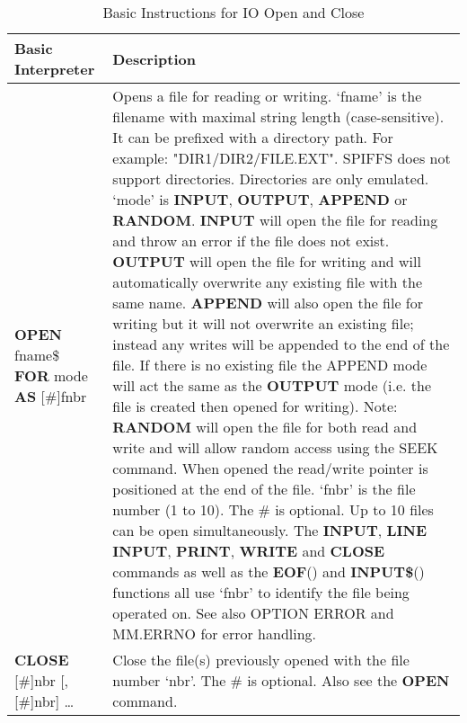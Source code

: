 \begin{table}[]
\centering
\caption{Basic Instructions for IO Open and Close}
\label{Basic_Instructions_for_IO_Open_Close}
\begin{tabular}{|p{4cm}|p{10cm}|}
\hline
\textbf{Basic Interpreter} & \textbf{Description}                                                   \\ \hline
\textbf{OPEN} fname\$ \textbf{FOR} mode
\textbf{AS} [\#]fnbr
& Opens a file for reading or writing.
‘fname’ is the filename with maximal string length (case-sensitive). It can be prefixed with a directory path. For example: "DIR1/DIR2/FILE.EXT". SPIFFS does not support directories. Directories are only emulated. \newline
‘mode’ is \textbf{INPUT}, \textbf{OUTPUT}, \textbf{APPEND} or \textbf{RANDOM}.\newline\newline
\textbf{INPUT} will open the file for reading and throw an error if the file does
not exist. \newline
\textbf{OUTPUT} will open the file for writing and will automatically
overwrite any existing file with the same name.\newline
\textbf{APPEND} will also open the file for writing but it will not overwrite an
existing file; instead any writes will be appended to the end of the file. If
there is no existing file the APPEND mode will act the same as the
\textbf{OUTPUT} mode (i.e. the file is created then opened for writing). \newline
Note:\newline
\textbf{RANDOM} will open the file for both read and write and will allow
random access using the SEEK command. When opened the read/write
pointer is positioned at the end of the file.\newline
‘fnbr’ is the file number (1 to 10). The \# is optional. Up to 10 files can
be open simultaneously. The \textbf{INPUT}, \textbf{LINE INPUT}, \textbf{PRINT}, \textbf{WRITE}
and \textbf{CLOSE} commands as well as the \textbf{EOF}() and \textbf{INPUT\$}() functions all
use ‘fnbr’ to identify the file being operated on.\newline
See also OPTION ERROR and MM.ERRNO for error handling.
\\ \hline
\textbf{CLOSE} [\#]nbr [,[\#]nbr] … &
Close the file(s) previously opened with the file number ‘nbr’.
The \# is optional. Also see the \textbf{OPEN} command.
\\ \hline
\end{tabular}
\end{table}

